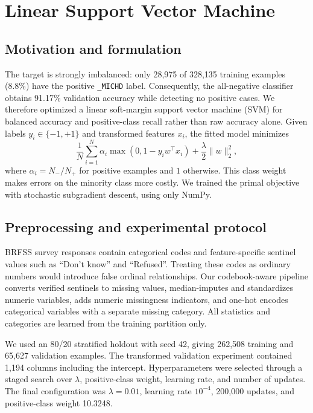 
\section{Linear Support Vector Machine}

\subsection{Motivation and formulation}

The target is strongly imbalanced: only 28,975 of 328,135 training examples
(8.8\%) have the positive \texttt{\_MICHD} label. Consequently, the
all-negative classifier obtains 91.17\% validation accuracy while detecting no
positive cases. We therefore optimized a linear soft-margin support vector
machine (SVM) for balanced accuracy and positive-class recall rather than raw
accuracy alone. Given labels $y_i\in\{-1,+1\}$ and transformed features
$x_i$, the fitted model minimizes
\begin{equation}
  \frac{1}{N}\sum_{i=1}^{N}\alpha_i
  \max\!\left(0,1-y_i w^\top x_i\right)
  +\frac{\lambda}{2}\lVert w\rVert_2^2,
  \label{eq:weighted-svm}
\end{equation}
where $\alpha_i=N_-/N_+$ for positive examples and $1$ otherwise. This class
weight makes errors on the minority class more costly. We trained the primal
objective with stochastic subgradient descent, using only NumPy.

\subsection{Preprocessing and experimental protocol}

BRFSS survey responses contain categorical codes and feature-specific sentinel
values such as ``Don't know'' and ``Refused''. Treating these codes as ordinary
numbers would introduce false ordinal relationships. Our codebook-aware
pipeline converts verified sentinels to missing values, median-imputes and
standardizes numeric variables, adds numeric missingness indicators, and
one-hot encodes categorical variables with a separate missing category. All
statistics and categories are learned from the training partition only.

We used an 80/20 stratified holdout with seed 42, giving 262,508 training and
65,627 validation examples. The transformed validation experiment contained
1,194 columns including the intercept. Hyperparameters were selected through
a staged search over $\lambda$, positive-class weight, learning rate, and
number of updates. The final configuration was $\lambda=0.01$, learning rate
$10^{-4}$, 200,000 updates, and positive-class weight 10.3248.

